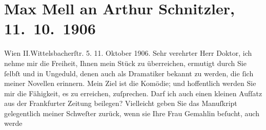 

         
         \renewcommand{\erwaehntePersonen}{Personen: Josef Kainz, Maria Mell, Olga Schnitzler}
         \renewcommand{\erwaehnteInstitutionen}{Institutionen: Frankfurter Zeitung}
         \renewcommand{\erwaehnteOrte}{Orte: Berlin, II., Leopoldstadt, Wien, Wittelsbachstraße}
         \renewcommand{\erwaehnteWerke}{Werke: Die Komödianten, Über die Briefe Beethovens}
               \section[Max Mell an Arthur Schnitzler, 11. 10. 1906]{ Max Mell an Arthur Schnitzler, 11. 10. 1906}\nopagebreak{}\rehead{ }\begin{ledgroupsized}[t]{13cm}\normalsize\beginnumbering \toendnotes[C]{\smallbreak\pagebreak[2]} 
\toendnotes[C]{\smallbreak}\pstart
           \noindent{}\raggedleft{}{\pb}Wien II.Wittelsbacherſtr. 5.\pend
           \pstart
           \raggedleft{}11. Oktober 1906.\pend
           \pstart{}Sehr verehrter Herr Doktor,\pend\pstart
           ich nehme mir die Freiheit, Ihnen mein Stück zu überreichen, ermutigt durch Sie ſelbſt und in
               Ungeduld, denen auch als Dramatiker bekannt zu werden, die ſich meiner Novellen
               erinnern. Mein Ziel ist die Komödie; und hoffentlich werden Sie mir die Fähigkeit, es
               zu erreichen, zuſprechen.\pend
           \pstart
           Darf ich auch einen kleinen Aufſatz aus der Frankfurter Zeitung
               beilegen?\pend
           \pstart
           Vielleicht geben Sie das Manuſkript gelegentlich meiner Schweſter zurück, wenn sie Ihre Frau Gemahlin beſucht, auch werde

\end{ledgroupsized}
